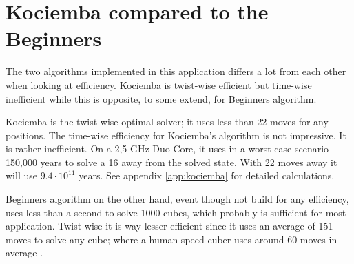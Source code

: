 \section{Kociemba compared to the Beginners}
The two algorithms implemented in this application differs a lot from each other when looking at efficiency. 
Kociemba is twist-wise efficient but time-wise inefficient while this is opposite, to some extend, for Beginners algorithm. 

Kociemba is the twist-wise optimal solver; it uses less than 22 moves for any positions. 
The time-wise efficiency for Kociemba's algorithm is not impressive. It is rather inefficient. On a 2,5 GHz Duo Core, it uses in a worst-case scenario 150,000 years to solve a \cube{} 16 \twist{} away from the solved state. With 22 moves away it will use $9.4\cdot{}10^{11}$ years. See appendix \ref{app:kociemba} for detailed calculations.   

Beginners algorithm on the other hand, event though not build for any efficiency, uses less than a second to solve 1000 cubes, which probably is sufficient for most application. 
Twist-wise it is way lesser efficient since it uses an average of 151 moves to solve any cube; where a human speed cuber uses around 60 moves in average \cite{larsPetrus97} \cite{cubeFreak}.
